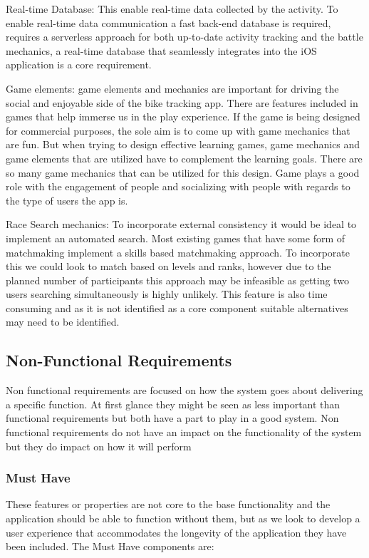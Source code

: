 \documentclass{l4proj}
\begin{document}
Real-time Database: This enable real-time data collected by the activity. To enable real-time data communication a fast back-end database is required,  requires a serverless approach for both up-to-date activity tracking and the battle mechanics, a real-time database that seamlessly integrates into the iOS application is a core requirement.

Game elements: game elements and mechanics are important for driving the social and enjoyable side of the bike tracking app. There are features included in games that help immerse us in the play experience. If the game is being designed for commercial purposes, the sole aim is to come up with game mechanics that are fun. But when trying to design effective learning games, game mechanics and game elements that are utilized have to complement the learning goals. There are so many game mechanics that can be utilized for this design. Game plays a good role with the engagement of people and socializing with people with regards to the type of users the app is.



Race Search mechanics: To incorporate external consistency it would be ideal to implement an automated search. Most existing games that have some form of matchmaking implement a skills based matchmaking approach. To incorporate this we could look to match based on levels and ranks, however due to the planned number of participants this approach may be infeasible as getting two users searching simultaneously is highly unlikely. This feature is also time consuming and as it is not identified as a core component suitable alternatives may need to be identified. 


\subsection{Non-Functional Requirements}

Non functional requirements are focused on how the system goes about delivering a specific function. At first glance they might be seen as less important than functional requirements but both have a part to play in a good system. Non functional requirements do not have an impact on the functionality of the system but they do impact on how it will perform 

\subsubsection{Must Have}\label{nonfuncmusthave}
These features or properties are not core to the base functionality and the application should be able to function without them, but as we look to develop a user experience that accommodates the longevity of the application they have been included. The Must Have components are: 
\end{document}
